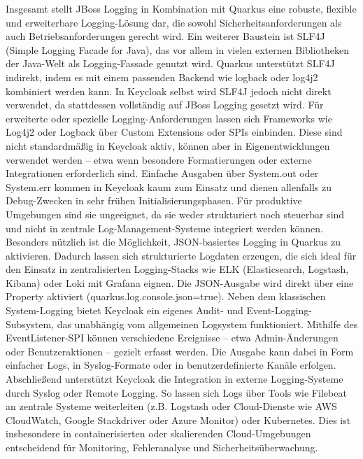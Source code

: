 \documentclass[a4paper,12pt]{article}
\begin{document}
	Insgesamt stellt JBoss Logging in Kombination mit Quarkus eine robuste, flexible und erweiterbare Logging-Lösung dar, die sowohl Sicherheitsanforderungen als auch Betriebsanforderungen gerecht wird.
	Ein weiterer Baustein ist SLF4J (Simple Logging Facade for Java), das vor allem in vielen externen Bibliotheken der Java-Welt als Logging-Fassade genutzt wird. Quarkus unterstützt SLF4J indirekt, indem es mit einem passenden Backend wie logback oder log4j2 kombiniert werden kann. In Keycloak selbst wird SLF4J jedoch nicht direkt verwendet, da stattdessen vollständig auf JBoss Logging gesetzt wird.
	\vspace{0.5em}
	Für erweiterte oder spezielle Logging-Anforderungen lassen sich Frameworks wie Log4j2 oder Logback über Custom Extensions oder SPIs einbinden. Diese sind nicht standardmäßig in Keycloak aktiv, können aber in Eigenentwicklungen verwendet werden – etwa wenn besondere Formatierungen oder externe Integrationen erforderlich sind.
	\vspace{0.5em}
	Einfache Ausgaben über System.out oder System.err kommen in Keycloak kaum zum Einsatz und dienen allenfalls zu Debug-Zwecken in sehr frühen Initialisierungsphasen. Für produktive Umgebungen sind sie ungeeignet, da sie weder strukturiert noch steuerbar sind und nicht in zentrale Log-Management-Systeme integriert werden können.
	\vspace{0.5em}
	Besonders nützlich ist die Möglichkeit, JSON-basiertes Logging in Quarkus zu aktivieren. Dadurch lassen sich strukturierte Logdaten erzeugen, die sich ideal für den Einsatz in zentralisierten Logging-Stacks wie ELK (Elasticsearch, Logstash, Kibana) oder Loki mit Grafana eignen. Die JSON-Ausgabe wird direkt über eine Property aktiviert (quarkus.log.console.json=true).
	\vspace{0.5em}
	Neben dem klassischen System-Logging bietet Keycloak ein eigenes Audit- und Event-Logging-Subsystem, das unabhängig vom allgemeinen Logsystem funktioniert. Mithilfe des EventListener-SPI können verschiedene Ereignisse – etwa Admin-Änderungen oder Benutzeraktionen – gezielt erfasst werden. Die Ausgabe kann dabei in Form einfacher Logs, in Syslog-Formate oder in benutzerdefinierte Kanäle erfolgen.
	\vspace{0.5em}
	Abschließend unterstützt Keycloak die Integration in externe Logging-Systeme durch Syslog oder Remote Logging. So lassen sich Logs über Tools wie Filebeat an zentrale Systeme weiterleiten (z.B. Logstash oder Cloud-Dienste wie AWS CloudWatch, Google Stackdriver oder Azure Monitor) oder Kubernetes. Dies ist insbesondere in containerisierten oder skalierenden Cloud-Umgebungen entscheidend für Monitoring, Fehleranalyse und Sicherheitsüberwachung.
	
\end{document}
